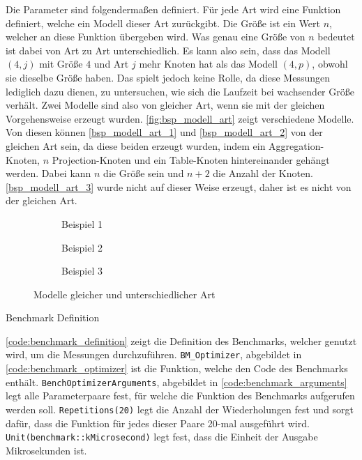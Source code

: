 Die Parameter sind folgendermaßen definiert. Für jede Art wird eine Funktion
definiert, welche ein Modell dieser Art zurückgibt. Die Größe ist ein Wert $n$,
welcher an diese Funktion übergeben wird. Was genau eine Größe von $n$ bedeutet
ist dabei von Art zu Art unterschiedlich. Es kann also sein, dass das Modell
$(4,j)$ mit Größe $4$ und Art $j$ mehr Knoten hat als das Modell $(4,p)$,
obwohl sie dieselbe Größe haben. Das spielt jedoch keine Rolle, da diese
Messungen lediglich dazu dienen, zu untersuchen, wie sich die Laufzeit bei
wachsender Größe verhält.
Zwei Modelle sind also von gleicher Art, wenn sie mit der gleichen
Vorgehensweise erzeugt wurden. \autoref{fig:bsp_modell_art} zeigt verschiedene
Modelle. Von diesen können \zB \autoref{bsp_modell_art_1} und
\autoref{bsp_modell_art_2} von der gleichen Art sein, da diese beiden erzeugt wurden,
indem ein \foreignlanguage{english}{Aggregation}-Knoten, $n$
\foreignlanguage{english}{Projection}-Knoten und ein
\foreignlanguage{english}{Table}-Knoten hintereinander gehängt werden.
Dabei kann \zB $n$ die Größe sein und $n+2$ die Anzahl der Knoten.
\autoref{bsp_modell_art_3} wurde nicht auf dieser Weise erzeugt, daher ist es
nicht von der gleichen Art. 

\begin{figure}
    \center
    \begin{subfigure}[b]{0.3\textwidth}
        
        \caption{Beispiel 1}\label{bsp_modell_art_1}
    \end{subfigure}
    \begin{subfigure}[b]{0.3\textwidth}
        
        \caption{Beispiel 2}\label{bsp_modell_art_2}
    \end{subfigure}
    \begin{subfigure}[b]{0.3\textwidth} 
        
        \caption{Beispiel 3}\label{bsp_modell_art_3}
    \end{subfigure}
    \caption{Modelle gleicher und unterschiedlicher Art}\label{fig:bsp_modell_art}
\end{figure}

\begin{listing}
    
\caption{Benchmark Definition}
\label{code:benchmark_definition}
\end{listing}

\autoref{code:benchmark_definition} zeigt die Definition des Benchmarks,
welcher genutzt wird, um die Messungen durchzuführen. \verb+BM_Optimizer+,
abgebildet in \autoref{code:benchmark_optimizer} ist die Funktion, welche den
Code des Benchmarks enthält. \verb+BenchOptimizerArguments+, abgebildet in
\autoref{code:benchmark_arguments} legt alle Parameterpaare fest, für welche
die Funktion des Benchmarks aufgerufen werden soll. \verb+Repetitions(20)+ legt
die Anzahl der Wiederholungen fest und sorgt dafür, dass die Funktion für jedes
dieser Paare 20-mal ausgeführt wird. \verb+Unit(benchmark::kMicrosecond)+ legt
fest, dass die Einheit der Ausgabe Mikrosekunden ist.

